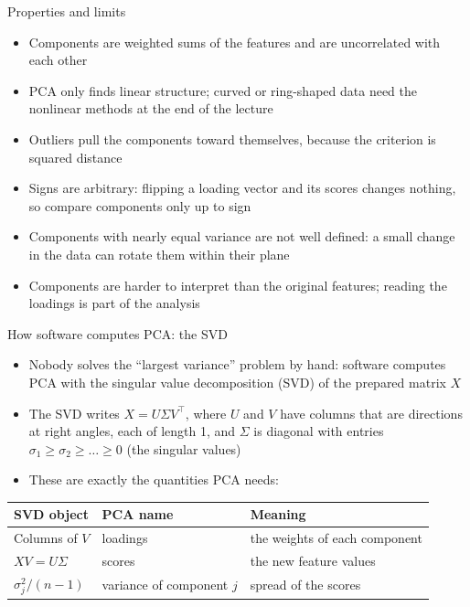\begin{frame}{Properties and limits}
    \begin{itemize}
        \item Components are weighted sums of the features and are uncorrelated with each other
        \item PCA only finds linear structure; curved or ring-shaped data need the nonlinear methods at the end of the lecture
        \item Outliers pull the components toward themselves, because the criterion is squared distance
        \item Signs are arbitrary: flipping a loading vector and its scores changes nothing, so compare components only up to sign
        \item Components with nearly equal variance are not well defined: a small change in the data can rotate them within their plane
        \item Components are harder to interpret than the original features; reading the loadings is part of the analysis
    \end{itemize}
\end{frame}

\begin{frame}{How software computes PCA: the SVD}
    \begin{itemize}
        \item Nobody solves the ``largest variance'' problem by hand: software computes PCA with the singular value decomposition (SVD) of the prepared matrix $X$
        \item The SVD writes $X = U \Sigma V^\top$, where $U$ and $V$ have columns that are directions at right angles, each of length 1, and $\Sigma$ is diagonal with entries $\sigma_1 \ge \sigma_2 \ge \dots \ge 0$ (the singular values)
        \item These are exactly the quantities PCA needs:
    \end{itemize}

    \svspace{0.4em}
    \centering
    \footnotesize
    \begin{tabular}{@{}l l l@{}}
        \toprule
        SVD object & PCA name & Meaning \\
        \midrule
        Columns of $V$ & loadings & the weights of each component \\
        $X V = U \Sigma$ & scores & the new feature values \\
        $\sigma_j^2 / (n - 1)$ & variance of component $j$ & spread of the scores \\
        \bottomrule
    \end{tabular}
\end{frame}

